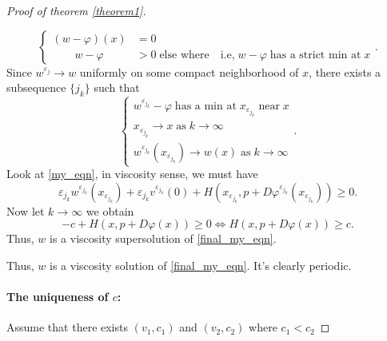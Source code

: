 \documentclass[12pt, oneside]{amsart}  	%
\begin{document}
\begin{proof}[Proof of theorem \ref{theorem1}]
\begin{itemize}
\begin{equation*}
\begin{cases}
(w - \varphi)(x) &= 0\\
\qquad w - \varphi &>0 \;\text{else where}\quad \text{i.e,}\; w-\varphi\;\text{has a strict min at}\; x
\end{cases}.
\end{equation*}
Since $w^{\varepsilon_j}\longrightarrow w$ uniformly on some compact neighborhood of $x$, there exists a subsequence $\{j_k\}$ such that
\begin{equation*}
\begin{cases}
w^{\varepsilon_{j_k}} - \varphi \;\text{has a min at}\; x_{\varepsilon_{j_k}}\;\text{near}\;x\\
x_{\varepsilon_{j_k}} \longrightarrow x \;\text{as}\; k\longrightarrow\infty\\
w^{\varepsilon_{j_k}}\left(x_{\varepsilon_{j_k}}\right) \longrightarrow w(x) \;\text{as}\; k\longrightarrow\infty
\end{cases}.
\end{equation*}
Look at \eqref{my_eqn}, in viscosity sense, we must have
\begin{equation*}
\varepsilon_{j_k}
w^{\varepsilon_{j_k}}\left(x_{\varepsilon_{j_k}}\right) +
\varepsilon_{j_k} v^{\varepsilon_{j_k}}(0) +
H(x_{\varepsilon_{j_k}},p+ D\varphi^{\varepsilon_{j_k}}(x_{\varepsilon_{j_k}})) \geq 0.
\end{equation*}
Now let $k\longrightarrow \infty$ we obtain
\begin{equation*}
-c + H(x,p+D\varphi(x)) \geq 0 \Longleftrightarrow H(x,p+D\varphi(x)) \geq c.
\end{equation*}
Thus, $w$ is a viscosity supersolution of \eqref{final_my_eqn}.
\end{itemize}
Thus, $w$ is a viscosity solution of \eqref{final_my_eqn}. It's clearly periodic.\\


\paragraph{\textbf{The uniqueness of $c$:}} Assume that there exists $(v_1,c_1)$ and $(v_2,c_2)$ where $c_1<c_2$


\end{proof}
\end{document}

